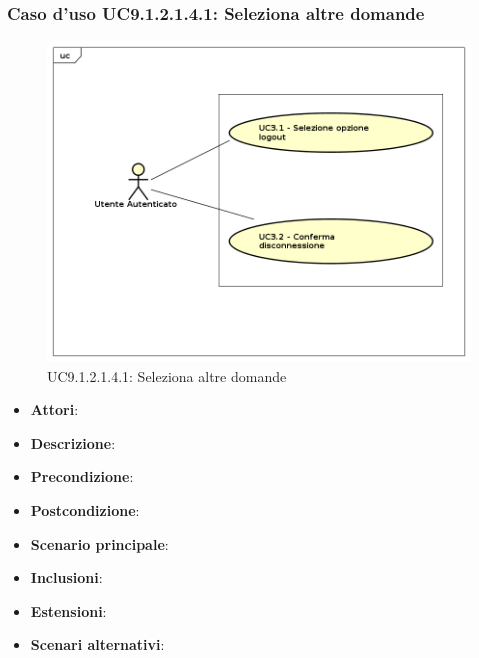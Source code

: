 						\subsubsection{Caso d'uso UC9.1.2.1.4.1: Seleziona altre domande}
						\label{UC9.1.2.1.4.1}
						\begin{figure}[h]
							\centering
						\includegraphics[scale=0.7,keepaspectratio]{UML/UC9.png}
							\caption{UC9.1.2.1.4.1: Seleziona altre domande}
						\end{figure}
						\FloatBarrier
						\begin{itemize}
							\item \textbf{Attori}: 
							\item \textbf{Descrizione}: 
							\item \textbf{Precondizione}: 
							\item \textbf{Postcondizione}: 
							\item \textbf{Scenario principale}:
							\item \textbf{Inclusioni}:
							\item \textbf{Estensioni}:
							\item \textbf{Scenari alternativi}:
						\end{itemize}
							
